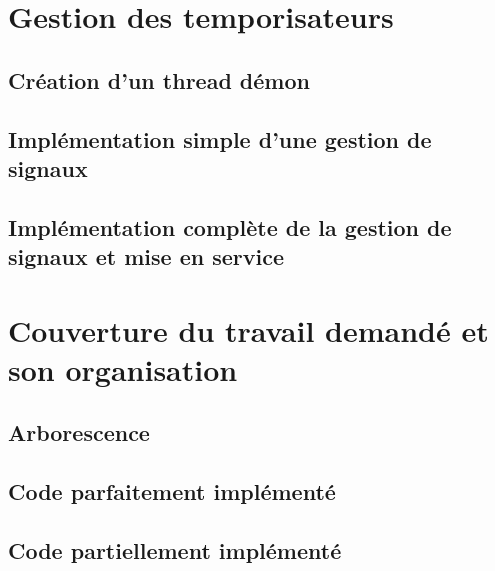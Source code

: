 \documentclass{report}
\begin{document}
\chapter{Gestion des temporisateurs}
\setcounter{section}{0}
\section{Création d'un thread démon}

\section{Implémentation simple d'une gestion de signaux}

\section{Implémentation complète de la gestion de signaux et mise en service}

\chapter{Couverture du travail demandé et son organisation}
\setcounter{section}{0}
\section{Arborescence}

\section{Code parfaitement implémenté}

\section{Code partiellement implémenté}
\end{document}
